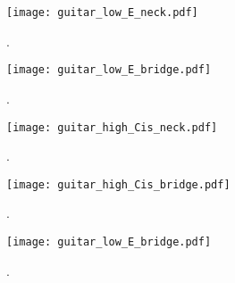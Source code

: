 \begin{figure}[h]
	\centering
		\texttt{[image: guitar\_low\_E\_neck.pdf]}
		\caption{.}
		\label{fig:appendix:low_E_neck}
\end{figure}

\begin{figure}[h]
	\centering
		\texttt{[image: guitar\_low\_E\_bridge.pdf]}
		\caption{.}
		\label{fig:appendix:low_E_bridge}
\end{figure}

\begin{figure}[h]
	\centering
		\texttt{[image: guitar\_high\_Cis\_neck.pdf]}
		\caption{.}
		\label{fig:appendix:low_high_Cis_neck}
\end{figure}

\begin{figure}[h]
	\centering
		\texttt{[image: guitar\_high\_Cis\_bridge.pdf]}
		\caption{.}
		\label{fig:appendix:low_high_Cis_bridge}
\end{figure}

\begin{figure}[h]
	\centering
		\texttt{[image: guitar\_low\_E\_bridge.pdf]}
		\caption{.}
		\label{fig:appendix:higfh_E_bridge_flasholet}
\end{figure}
